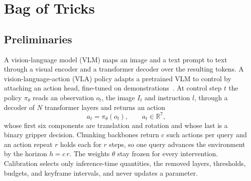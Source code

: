 %
%
%
%

\section{Bag of Tricks}

\subsection{Preliminaries}

A vision-language model (VLM) maps an image and a text prompt to text through a
visual encoder and a transformer decoder over the resulting tokens. A
vision-language-action (VLA) policy adapts a pretrained VLM to control by
attaching an action head, fine-tuned on demonstrations~\cite{openvla, spatialvla,
univla}. At control step $t$ the policy $\pi_\theta$ reads an observation $o_t$,
the image $I_t$ and instruction $l$, through a decoder of $N$ transformer layers
and returns an action
\begin{equation}
a_t = \pi_\theta(o_t), \qquad a_t \in \mathbb{R}^7,
\end{equation}
whose first six components are translation and rotation and whose last is a
binary gripper decision. Chunking backbones return $c$ such actions per query
and an action repeat $r$ holds each for $r$ steps, so one query advances the
environment by the horizon $h = c\,r$. The weights $\theta$ stay frozen for
every intervention. Calibration selects only inference-time quantities, the
removed layers, thresholds, budgets, and keyframe intervals, and never updates
a parameter.


